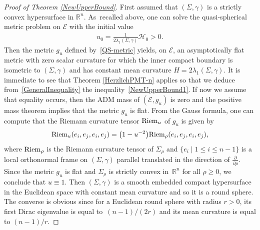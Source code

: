 \documentclass[pdftex]{sigma}
\numberwithin{equation}{section}
\begin{document}
\begin{proof}[Proof of Theorem \ref{NewUpperBound}]
First assumed that $(\Sigma,\gamma)$ is a strictly convex hypersurface in $\mathbb{R}^n$. As~recalled above, one can solve the quasi-spherical metric problem on $\mathcal{E}$ with the initial value
\begin{gather*}%
u_0=\frac{1}{2\lambda_1(\Sigma,\gamma)}\mathcal{H}_0>0.
\end{gather*}
Then the metric $g_u$ defined by~\eqref{QS-metric} yields, on $\mathcal{E}$, an asymptotically flat metric with zero scalar curvature for which the inner compact boundary is isometric to $(\Sigma,\gamma)$ and has constant mean curvature $H=2\lambda_1(\Sigma,\gamma)$. It is immediate to see that Theorem \ref{HerzlichPMT-n} applies so that we deduce from~\eqref{GeneralInequality} the inequality~\eqref{NewUpperBound1}. If now we assume that equality occurs, then the ADM mass of $(\mathcal{E},g_u)$ is zero and the positive mass theorem implies that the metric $g_u$ is flat. From the Gauss formula, one can compute that the Riemann curvature tensor ${\rm Riem}_u$ of $g_u$ is given by
\begin{gather*}%
{\rm Riem}_u(e_i,e_j,e_i,e_j)=\big(1-u^{-2}\big){\rm Riem}_\rho(e_i,e_j,e_i,e_j),
\end{gather*}
where ${\rm Riem}_\rho$ is the Riemann curvature tensor of $\Sigma_\rho$ and $\{e_i\mid 1\leq i\leq n-1\}$ is a local orthonormal frame on $(\Sigma,\gamma)$ parallel translated in the direction of $\frac{\partial}{\partial \rho}$. Since the metric $g_u$ is flat and $\Sigma_\rho$ is strictly convex in~$\mathbb{R}^n$ for all $\rho\geq0$, we conclude that $u\equiv 1$. Then $(\Sigma,\gamma)$ is a smooth embedded compact hypersurface in the Euclidean space with constant mean curvature and so it is a round sphere. The converse is obvious since for a Euclidean round sphere with radius $r>0$, its first Dirac eigenvalue is equal to~$(n-1)/(2r)$ and its mean curvature is equal to $(n-1)/r$.


\end{proof}
\end{document}
